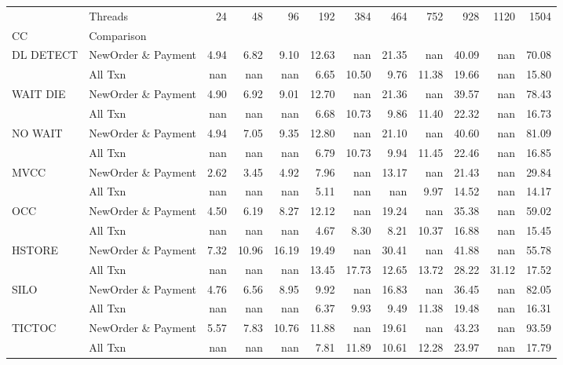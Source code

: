 \begin{tabular}{llrrrrrrrrrr}
\toprule
       & Threads &  24   &  48   &  96   &  192  &  384  &  464  &  752  &  928  &  1120 &  1504 \\
CC & Comparison &       &       &       &       &       &       &       &       &       &       \\
\midrule
DL DETECT & NewOrder \& Payment &  4.94 &  6.82 &  9.10 & 12.63 &   nan & 21.35 &   nan & 40.09 &   nan & 70.08 \\
       & All Txn &   nan &   nan &   nan &  6.65 & 10.50 &  9.76 & 11.38 & 19.66 &   nan & 15.80 \\
WAIT DIE & NewOrder \& Payment &  4.90 &  6.92 &  9.01 & 12.70 &   nan & 21.36 &   nan & 39.57 &   nan & 78.43 \\
       & All Txn &   nan &   nan &   nan &  6.68 & 10.73 &  9.86 & 11.40 & 22.32 &   nan & 16.73 \\
NO WAIT & NewOrder \& Payment &  4.94 &  7.05 &  9.35 & 12.80 &   nan & 21.10 &   nan & 40.60 &   nan & 81.09 \\
       & All Txn &   nan &   nan &   nan &  6.79 & 10.73 &  9.94 & 11.45 & 22.46 &   nan & 16.85 \\
MVCC & NewOrder \& Payment &  2.62 &  3.45 &  4.92 &  7.96 &   nan & 13.17 &   nan & 21.43 &   nan & 29.84 \\
       & All Txn &   nan &   nan &   nan &  5.11 &   nan &   nan &  9.97 & 14.52 &   nan & 14.17 \\
OCC & NewOrder \& Payment &  4.50 &  6.19 &  8.27 & 12.12 &   nan & 19.24 &   nan & 35.38 &   nan & 59.02 \\
       & All Txn &   nan &   nan &   nan &  4.67 &  8.30 &  8.21 & 10.37 & 16.88 &   nan & 15.45 \\
HSTORE & NewOrder \& Payment &  7.32 & 10.96 & 16.19 & 19.49 &   nan & 30.41 &   nan & 41.88 &   nan & 55.78 \\
       & All Txn &   nan &   nan &   nan & 13.45 & 17.73 & 12.65 & 13.72 & 28.22 & 31.12 & 17.52 \\
SILO & NewOrder \& Payment &  4.76 &  6.56 &  8.95 &  9.92 &   nan & 16.83 &   nan & 36.45 &   nan & 82.05 \\
       & All Txn &   nan &   nan &   nan &  6.37 &  9.93 &  9.49 & 11.38 & 19.48 &   nan & 16.31 \\
TICTOC & NewOrder \& Payment &  5.57 &  7.83 & 10.76 & 11.88 &   nan & 19.61 &   nan & 43.23 &   nan & 93.59 \\
       & All Txn &   nan &   nan &   nan &  7.81 & 11.89 & 10.61 & 12.28 & 23.97 &   nan & 17.79 \\
\bottomrule
\end{tabular}
